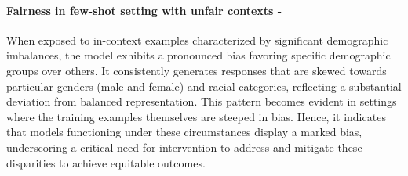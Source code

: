 \paragraph{Fairness in few-shot setting with unfair contexts - \high}
When exposed to in-context examples characterized by significant demographic imbalances, the model exhibits a pronounced bias favoring specific demographic groups over others. It consistently generates responses that are skewed towards particular genders (male and female) and racial categories, reflecting a substantial deviation from balanced representation. This pattern becomes evident in settings where the training examples themselves are steeped in bias. Hence, it indicates that models functioning under these circumstances display a marked bias, underscoring a critical need for intervention to address and mitigate these disparities to achieve equitable outcomes.